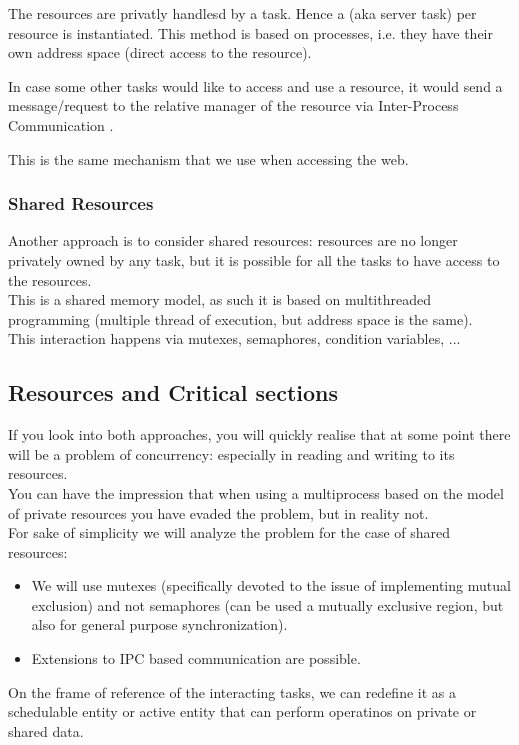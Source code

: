 The resources are privatly handlesd by a task. Hence a  (aka server task) per resource is instantiated.
This method is based on processes, i.e. they have their own address space (direct access to the resource).

In case some other tasks would like to access and use a resource, it would send a message/request to the relative manager of the resource via Inter-Process Communication .

This is the same mechanism that we use when accessing the web.

\subsubsection{Shared Resources}
Another approach is to consider shared resources: resources are no longer privately owned by any task, but it is possible for all the tasks to have access to the resources.\\
This is a shared memory model, as such it is based on multithreaded programming (multiple thread of execution, but address space is the same).\\
This interaction happens via mutexes, semaphores, condition variables, ...


\subsection{Resources and Critical sections}

If you look into both approaches, you will quickly realise that at some point there will be a problem of concurrency: especially in reading and writing to its resources.\\
You can have the impression that when using a multiprocess based on the model of private resources you have evaded the problem, but in reality not.\\
For sake of simplicity we will analyze the problem for the case of shared resources:
\begin{itemize}
\item We will use mutexes (specifically devoted to the issue of implementing mutual exclusion) and not semaphores (can be used a mutually exclusive region, but also for general purpose synchronization).
\item Extensions to IPC based communication are possible.
\end{itemize}

On the frame of reference of the interacting tasks, we can redefine it as a schedulable entity or active entity that can perform operatinos on private or shared data.

